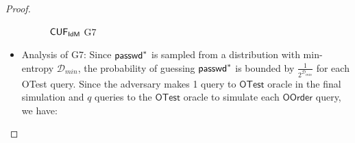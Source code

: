 \begin{proof}
\begin{itemize}
\begin{figure*}
\begin{pchstack}[center, space=0.2cm, boxed]
    \begin{pcvstack}
    \end{pcvstack}
    \begin{pcvstack}
    \end{pcvstack}
    \end{pchstack}
\caption{$\mathsf{CUF}_{\textsf{IdM}}$ \textsf{G7}}
\label{game:cuf_idmg5}
\end{figure*}

\item Analysis of \textsf{G7}: Since $\textsf{passwd}^*$ is sampled from a distribution with min-entropy $\mathcal{D}_{min}$, the probability of guessing $\textsf{passwd}^*$ is bounded by $\frac{1}{2^{\mathcal{D}_{min}}}$ for each \textsf{OTest} query. Since the adversary makes 1 query to $\mathsf{OTest}$ oracle in the final simulation and $q$ queries to the $\mathsf{OTest}$ oracle to simulate each $\mathsf{OOrder}$ query, we have:


\end{itemize}
\end{proof}

